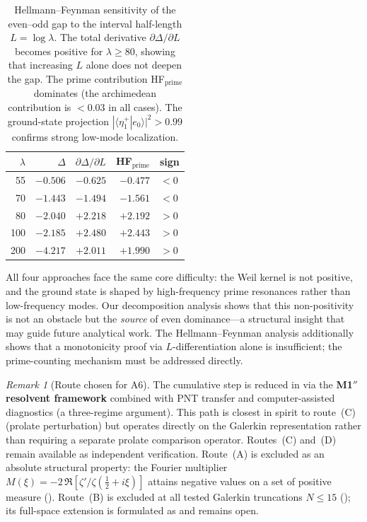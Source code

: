 \documentclass[12pt,a4paper]{article}
\theoremstyle{definition}
\theoremstyle{remark}
\newtheorem{remark}[theorem]{Remark}
\begin{document}
\begin{table}[h]
\centering
\renewcommand{\arraystretch}{1.15}
\begin{tabular}{r|r|r|r|l}
$\lambda$ & $\Delta$ & $\partial\Delta/\partial L$ & HF$_{\mathrm{prime}}$ & sign \\\hline
55  & $-0.506$ & $-0.625$ & $-0.477$ & $<0$ \\
70  & $-1.443$ & $-1.494$ & $-1.561$ & $<0$ \\
80  & $-2.040$ & $+2.218$ & $+2.192$ & $>0$ \\
100 & $-2.185$ & $+2.480$ & $+2.443$ & $>0$ \\
200 & $-4.217$ & $+2.011$ & $+1.990$ & $>0$ \\
\end{tabular}
\caption{Hellmann--Feynman sensitivity of the even--odd gap to the interval half-length $L = \log\lambda$. The total derivative $\partial\Delta/\partial L$ becomes positive for $\lambda \geq 80$, showing that increasing $L$ alone does not deepen the gap. The prime contribution HF$_{\mathrm{prime}}$ dominates (the archimedean contribution is $< 0.03$ in all cases). The ground-state projection $|\langle \eta^+_1 | e_0 \rangle|^2 > 0.99$ confirms strong low-mode localization.}
\label{tab:hf-results}
\end{table}

All four approaches face the same core difficulty: the Weil kernel is not positive, and the ground state is shaped by high-frequency prime resonances rather than low-frequency modes. Our decomposition analysis shows that this non-positivity is not an obstacle but the \emph{source} of even dominance---a structural insight that may guide future analytical work. The Hellmann--Feynman analysis additionally shows that a monotonicity proof via $L$-differentiation alone is insufficient; the prime-counting mechanism must be addressed directly.

\begin{remark}[Route chosen for A6]
The cumulative step is reduced in  via the \textbf{M1$''$ resolvent framework} combined with PNT transfer and computer-assisted diagnostics (a three-regime argument). This path is closest in spirit to route~(C) (prolate perturbation) but operates directly on the Galerkin representation rather than requiring a separate prolate comparison operator. Routes~(C) and~(D) remain available as independent verification. Route~(A) is excluded as an absolute structural property: the Fourier multiplier $M(\xi) = -2\,\Re[\zeta'/\zeta(\tfrac{1}{2}+i\xi)]$ attains negative values on a set of positive measure (). Route~(B) is excluded at all tested Galerkin truncations $N \leq 15$ (); its full-space extension is formulated as  and remains open.
\end{remark}
\end{document}
